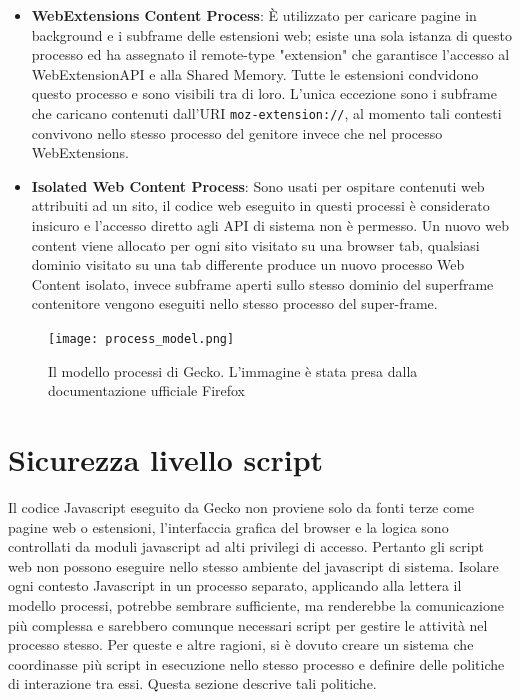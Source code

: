 \documentclass{sapthesis}
\newcommand{\code}[1]{\texttt{#1}}
\newcommand{\JS}{Javascript}
\begin{document}
        \begin{itemize}
            \item \textbf{WebExtensions Content Process}: È utilizzato per caricare pagine
                in background e i subframe delle estensioni web; esiste una sola istanza di
                questo processo ed ha assegnato il remote-type "extension" che garantisce 
                l'accesso al WebExtensionAPI e alla Shared Memory. Tutte le estensioni condvidono
                questo processo e sono visibili tra di loro.
                L'unica eccezione sono i subframe che caricano contenuti dall'URI \code{moz-extension://},
                al momento tali contesti convivono nello stesso processo del genitore invece che
                nel processo WebExtensions.

            \item \textbf{Isolated Web Content Process}: Sono usati per ospitare contenuti web attribuiti ad un sito,
                il codice web eseguito in questi processi è considerato insicuro e l'accesso diretto agli
                API di sistema non è permesso. Un nuovo web content viene allocato per ogni sito visitato su
                una browser tab, qualsiasi dominio visitato su una tab differente produce un nuovo processo
                Web Content isolato, invece subframe aperti sullo stesso dominio del superframe contenitore
                vengono eseguiti nello stesso processo del super-frame.
        \end{itemize}

        \begin{figure}[ht]
            \centering
            \texttt{[image: process\_model.png]}
            \caption{Il modello processi di Gecko. L'immagine è stata presa dalla documentazione ufficiale Firefox \cite{firefox-process-model}}
            \label{fig:process-model}
        \end{figure}

    \section{Sicurezza livello script}
    \label{sec:sicurezza-script}
        Il codice Javascript eseguito da Gecko non proviene solo da fonti terze come pagine web o estensioni,
        l'interfaccia grafica del browser e la logica sono controllati da moduli javascript ad
        alti privilegi di accesso. Pertanto gli script web non possono eseguire nello stesso ambiente del
        javascript di sistema. Isolare ogni contesto \JS{} in un processo separato, applicando alla lettera
        il modello processi, potrebbe sembrare sufficiente, ma renderebbe la comunicazione più complessa
        e sarebbero comunque necessari script per gestire le attività nel processo stesso.
        Per queste e altre ragioni, si è dovuto creare un sistema che coordinasse più script in esecuzione
        nello stesso processo e definire delle politiche di interazione tra essi. 
        Questa sezione descrive tali politiche.
\end{document}
